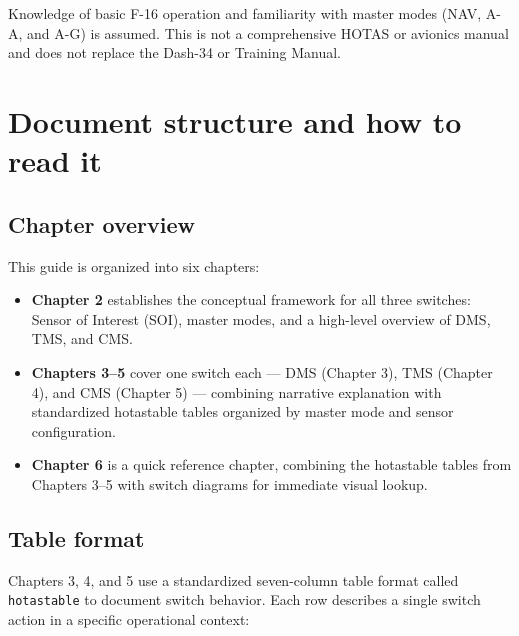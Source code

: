\documentclass[11pt, a4paper, twoside]{report}
\begin{document}
Knowledge of basic F-16 operation and familiarity with master modes (NAV, A-A, and A-G) is assumed. This is not a comprehensive HOTAS or avionics manual and does not replace the Dash-34 or Training Manual.

\section{Document structure and how to read it}
\label{sec:C1-S3}

\subsection{Chapter overview}
\label{sec:C1-S3-S1}

This guide is organized into six chapters:

\begin{itemize}
	\item \textbf{Chapter 2} establishes the conceptual framework for all three switches: Sensor of Interest (SOI), master modes, and a high-level overview of DMS, TMS, and CMS.
	\item \textbf{Chapters 3--5} cover one switch each --- DMS (Chapter 3), TMS (Chapter 4), and CMS (Chapter 5) --- combining narrative explanation with standardized hotastable tables organized by master mode and sensor configuration.
	\item \textbf{Chapter 6} is a quick reference chapter, combining the hotastable tables from Chapters 3--5 with switch diagrams for immediate visual lookup.
\end{itemize}

\subsection{Table format}
\label{sec:C1-S3-S2}

Chapters 3, 4, and 5 use a standardized seven-column table format called \texttt{hotastable} to document switch behavior. Each row describes a single switch action in a specific operational context:
\end{document}

